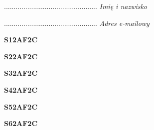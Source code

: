 \begin{turn}{90}\begin{minipage}{\linewidth} \vspace{20mm} ................................................  \textit{Imię i nazwisko}\end{minipage}\end{turn}

\begin{turn}{90}\begin{minipage}{\linewidth} \vspace{20mm} ................................................  \textit{Adres e-mailowy}\end{minipage}\end{turn}

\begin{turn}{90}\huge \begin{minipage}{\linewidth} \vspace{10mm}\textbf{S12AF2C}\end{minipage}\end{turn}

\begin{turn}{90}\huge \begin{minipage}{\linewidth} \vspace{10mm}\textbf{S22AF2C}\end{minipage}\end{turn}

\begin{turn}{90}\huge \begin{minipage}{\linewidth} \vspace{10mm}\textbf{S32AF2C}\end{minipage}\end{turn}

\begin{turn}{90}\huge \begin{minipage}{\linewidth} \vspace{10mm}\textbf{S42AF2C}\end{minipage}\end{turn}

\begin{turn}{90}\huge \begin{minipage}{\linewidth} \vspace{10mm}\textbf{S52AF2C}\end{minipage}\end{turn}

\begin{turn}{90}\huge \begin{minipage}{\linewidth} \vspace{10mm}\textbf{S62AF2C}\end{minipage}\end{turn}

